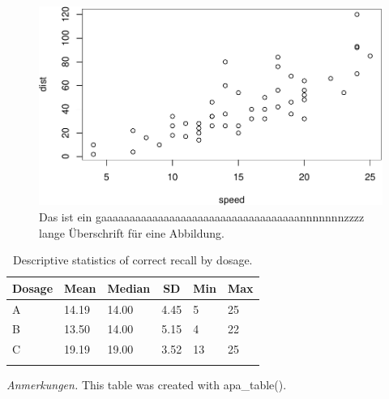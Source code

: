 \documentclass[
  doc,floatsintext]{apa6}
\begin{document}
\clearpage

\begin{figure}
\includegraphics[width=\textwidth]{rmd_apa_deutsch_files/figure-latex/plotcar-1} \caption{Das ist ein gaaaaaaaaaaaaaaaaaaaaaaaaaaaaaaaaaaannnnnnnzzzz lange Überschrift für eine Abbildung.}\label{fig:plotcar}
\end{figure}

\begin{table}[tbp]

\begin{center}
\begin{threeparttable}

\caption{\label{tab:mixedtab}Descriptive statistics of correct recall by dosage.}

\begin{tabular}{llllll}
\toprule
Dosage & \multicolumn{1}{c}{Mean} & \multicolumn{1}{c}{Median} & \multicolumn{1}{c}{SD} & \multicolumn{1}{c}{Min} & \multicolumn{1}{c}{Max}\\
\midrule
A & 14.19 & 14.00 & 4.45 & 5 & 25\\
B & 13.50 & 14.00 & 5.15 & 4 & 22\\
C & 19.19 & 19.00 & 3.52 & 13 & 25\\
\bottomrule
\addlinespace
\end{tabular}

\begin{tablenotes}[para]
\normalsize{\textit{Anmerkungen.} This table was created with apa\_table().}
\end{tablenotes}

\end{threeparttable}
\end{center}

\end{table}
\end{document}
